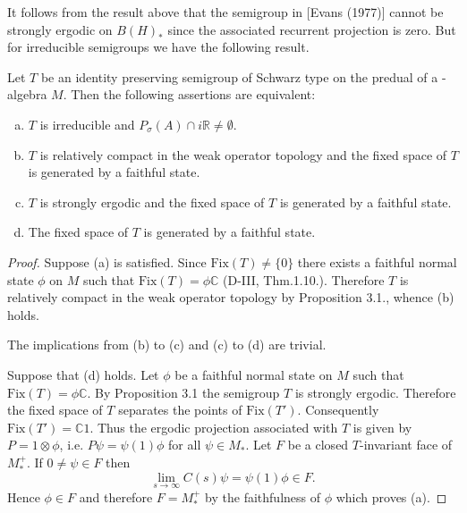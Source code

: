 It follows from the result above that the semigroup in [Evans (1977)] cannot be strongly ergodic on $B(H)_{*}$ since the associated recurrent projection is zero.
But for irreducible semigroups we have the following result.

\newpage

\begin{proposition}\label{prop:d4-3.4}
Let $T$ be an identity preserving semigroup of Schwarz type on the predual of a \WA-algebra $M$.
Then the following assertions are equivalent:

\begin{enumerate}[(a)]
\item
$T$ is irreducible and $P_{\sigma}(A) \cap i\mathbb{R} \neq \emptyset$.

\item
$T$ is relatively compact in the weak operator topology and the fixed space of $T$ is generated by a faithful state.

\item
$T$ is strongly ergodic and the fixed space of $T$ is generated by a faithful state.

\item
The fixed space of $T$ is generated by a faithful state.
\end{enumerate}
\end{proposition}

\begin{proof}
Suppose (a) is satisfied.
Since $\text{Fix}(T) \neq \{0\}$ there exists a faithful normal state $\phi$ on $M$ such that $\text{Fix}(T) = \phi\mathbb{C}$ (D-III, Thm.1.10.).
Therefore $T$ is relatively compact in the weak operator topology by Proposition 3.1., whence (b) holds.

The implications from (b) to (c) and (c) to (d) are trivial.

Suppose that (d) holds.
Let $\phi$ be a faithful normal state on $M$ such that $\text{Fix}(T) = \phi\mathbb{C}$.
By Proposition 3.1 the semigroup $T$ is strongly ergodic.
Therefore the fixed space of $T$ separates the points of $\text{Fix}(T')$.
Consequently $\text{Fix}(T') = \mathbb{C}1$.
Thus the ergodic projection associated with $T$ is given by $P = 1 \otimes \phi$, i.e. $P\psi = \psi(1)\phi$ for all $\psi \in M_{*}$.
Let $F$ be a closed $T$-invariant face of $M_{*}^{+}$.
If $0 \neq \psi \in F$ then
\[
\lim_{s \to \infty} C(s)\psi = \psi(1)\phi \in F.
\]
Hence $\phi \in F$ and therefore $F = M_{*}^{+}$ by the faithfulness of $\phi$ which proves (a).
\end{proof}

